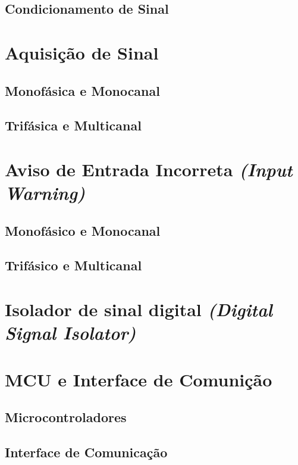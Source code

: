 \subsection{Condicionamento de Sinal}\label{sec:SignalConditioning}



\section{Aquisição de Sinal}\label{sec:aqSignal}

    \subsection{Monofásica e Monocanal}\label{subsec:aqSMono}

    \subsection{Trifásica e Multicanal}\label{subsec:aqSMulti}

\section{Aviso de Entrada Incorreta \textit{(Input Warning)}}\label{sec:inpWarning}

    \subsection{Monofásico e Monocanal}\label{subsec:inpWMono}

    \subsection{Trifásico e Multicanal}\label{subsec:inpWMulti}

\section{Isolador de sinal digital \textit{(Digital Signal Isolator)}}\label{sec:DSIsolator}

\section{MCU e Interface de Comunição}\label{sec:MCUInterface}

    \subsection{Microcontroladores}\label{subsec:MCU}

    \subsection{Interface de Comunicação}\label{sec:Interface}